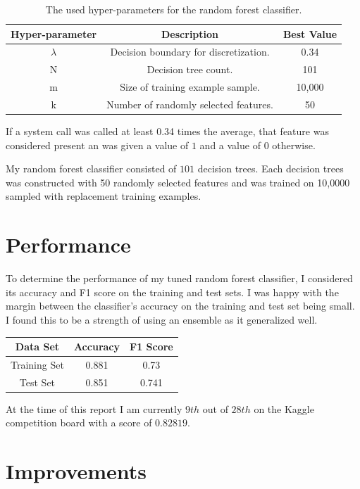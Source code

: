 \documentclass[a4paper, 11pt]{article} %
\begin{document}
\begin{table}[H]
{\renewcommand{\arraystretch}{1.2}%
\begin{tabular}{| c | c | c |}
\hline
Hyper-parameter & Description & Best Value\\
\hline
$\lambda$ & Decision boundary for discretization. & 0.34\\ \hline
N & Decision tree count. & 101\\ \hline
m & Size of training example sample. & 10,000\\ \hline
k & Number of randomly selected features. & 50\\ \hline
\end{tabular}}
\caption{The used hyper-parameters for the random forest classifier.}
\end{table}

If a system call was called at least 0.34 times the average, that feature was considered present an was given a value of $1$ and a value of $0$ otherwise. 

My random forest classifier consisted of $101$ decision trees. Each decision trees was constructed with 50 randomly selected features and was trained on 10,0000 sampled with replacement training examples.

\section*{Performance}
To determine the performance of my tuned random forest classifier, I considered its accuracy and F1 score on the training and test sets. I was happy with the margin between the classifier's accuracy on the training and test set being small. I found this to be a strength of using an ensemble as it generalized well.

\begin{table}[H]
{\renewcommand{\arraystretch}{1.2}%
\begin{tabular}{| c | c | c |}
\hline
Data Set & Accuracy & F1 Score\\
\hline
Training Set & 0.881 & 0.73\\ \hline
Test Set & 0.851 & 0.741\\ \hline
\end{tabular}}
\end{table}

At the time of this report I am currently $9th$ out of $28th$ on the Kaggle competition board with a score of $0.82819$.

\section*{Improvements}
\end{document}
